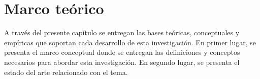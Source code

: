 
\chapter{Marco teórico}
\label{chp:marco_teorico}
A través del presente capítulo se entregan las bases teóricas, conceptuales y empíricas que soportan cada desarrollo de esta investigación. En primer lugar, se presenta el marco conceptual donde se entregan las definiciones y conceptos necesarios para abordar esta investigación. En segundo lugar, se presenta el estado del arte relacionado con el tema.





